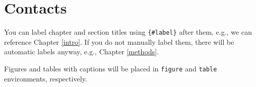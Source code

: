 \documentclass[]{book}
\begin{document}
\chapter*{Contacts}\label{contacts}

You can label chapter and section titles using \texttt{\{\#label\}}
after them, e.g., we can reference Chapter \ref{intro}. If you do not
manually label them, there will be automatic labels anyway, e.g.,
Chapter \ref{methods}.

Figures and tables with captions will be placed in \texttt{figure} and
\texttt{table} environments, respectively.


\end{document}
